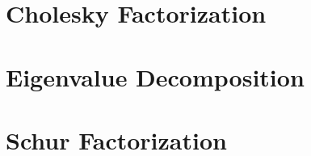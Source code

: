\section{Cholesky Factorization}

\section{Eigenvalue Decomposition}

\section{Schur Factorization}

